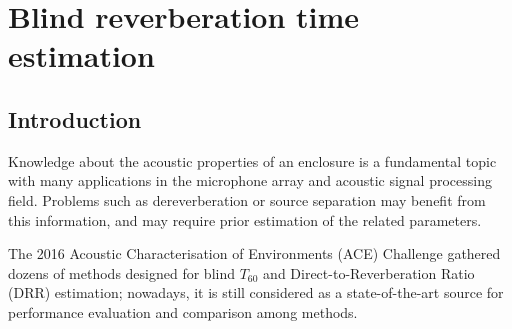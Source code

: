 \chapter{Blind reverberation time estimation}




\section{Introduction}

Knowledge about the acoustic properties of an enclosure is a fundamental topic with many applications in the microphone array and acoustic signal processing field.
Problems such as dereverberation \cite{braun2018evaluation} or source separation \cite{gannot2017consolidated} may benefit from this information, 
and may require prior estimation of the related parameters.

The 2016 Acoustic Characterisation of Environments (ACE) Challenge \cite{eaton2016estimation} gathered dozens of methods designed for blind $T_{60}$ and Direct-to-Reverberation Ratio (DRR) estimation; nowadays, it is still considered as a state-of-the-art source for 
performance evaluation and comparison among methods.

